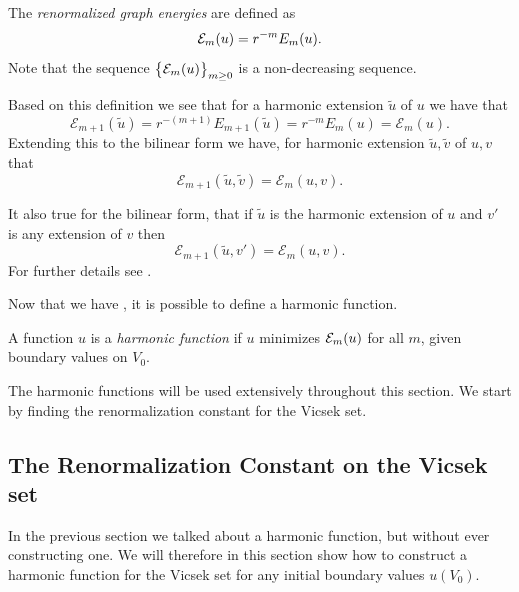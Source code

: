 \medskip
\begin{defi}\label{renormalizedGraphEnergies}
	The \emph{renormalized graph energies} are defined as
	\begin{equation}
		\mathcal{E}_{m}(u) = r^{-m}E_m(u).
	\end{equation}
	Note that the sequence $\cbr{\eee_{m}(u)}_{m \geq 0}$ is a non-decreasing sequence. 
\end{defi}

\medskip
Based on this definition we see that for a harmonic extension $\tilde{u}$ of $u$ we have that 
\begin{equation}
	\mathcal{E}_{m+1}(\tilde{u}) = r^{-(m+1)}E_{m+1}(\tilde{u}) = r^{-m}E_{m}(u) = \mathcal{E}_{m}(u).
\end{equation}
Extending this to the bilinear form we have, for harmonic extension $\tilde{u}, \tilde{v}$ of $u, v$ that
\begin{equation}
	\mathcal{E}_{m+1}(\tilde{u}, \tilde{v}) = \mathcal{E}_{m}(u,v).
\end{equation}

It also true for the bilinear form, that if $\tilde{u}$ is the harmonic extension of $u$ and $v'$ is any extension of $v$ then
\begin{equation}\label{bilinearFormRenormalized}
	\mathcal{E}_{m+1}(\tilde{u}, v') = \mathcal{E}_{m}(u,v).
\end{equation}
For further details see \cite{strichartz}.

Now that we have , it is possible to define a harmonic function.

\medskip
\begin{defi}
	A function $u$ is a \emph{harmonic function} if $u$ minimizes $\mathcal{E}_{m}(u)$ for all $m$, given boundary values on $V_0$.
\end{defi}

The harmonic functions will be used extensively throughout this section. We start by finding the renormalization constant for the Vicsek set.

\subsection{The Renormalization Constant on the Vicsek set}

In the previous section we talked about a harmonic function, but without ever constructing one. We will therefore in this section show how to construct a harmonic function for the Vicsek set for any initial boundary values $u(V_0)$.

